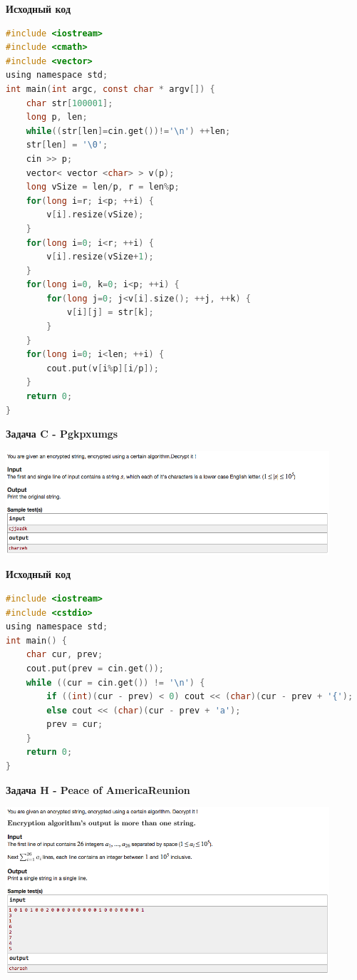 \documentclass[a4paper,12pt]{article}
\begin{document}
\textbf{{\large Исходный код}} \\
\begin{lstlisting}[language=C]
#include <iostream>
#include <cmath>
#include <vector>
using namespace std;
int main(int argc, const char * argv[]) {
    char str[100001];
    long p, len;
    while((str[len]=cin.get())!='\n') ++len;
    str[len] = '\0';
    cin >> p;
    vector< vector <char> > v(p);
    long vSize = len/p, r = len%p;
    for(long i=r; i<p; ++i) {
        v[i].resize(vSize);
    }
    for(long i=0; i<r; ++i) {
        v[i].resize(vSize+1);
    }
    for(long i=0, k=0; i<p; ++i) {
        for(long j=0; j<v[i].size(); ++j, ++k) {
            v[i][j] = str[k];
        }
    }
    for(long i=0; i<len; ++i) {
        cout.put(v[i%p][i/p]);
    }
    return 0;
}
\end{lstlisting}

\newpage
\textbf{{\large Задача C - Pgkpxumgs}}

\begin{center}
\includegraphics[width=0.9\textwidth]{CT_Crypto/CT_Crypto_C.png}\\ [1cm]
\end{center}

\textbf{{\large Исходный код}} \\
\begin{lstlisting}[language=C]
#include <iostream>
#include <cstdio>
using namespace std;
int main() {
	char cur, prev;
	cout.put(prev = cin.get());
	while ((cur = cin.get()) != '\n') {
		if ((int)(cur - prev) < 0) cout << (char)(cur - prev + '{');
		else cout << (char)(cur - prev + 'a');
		prev = cur;
 	}
	return 0;
}
\end{lstlisting}

\newpage
\textbf{{\large Задача H - Peace of AmericaReunion}}

\begin{center}
\includegraphics[width=0.9\textwidth]{CT_Crypto/CT_Crypto_H.png}\\ [1cm]
\end{center}
\end{document}
